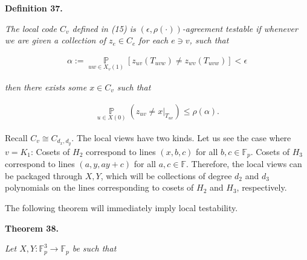 \documentclass[10pt,a4paper]{article}
\begin{document}


\par\medskip\noindent\textbf{
\textbf{Definition 37}\textbf{.}
}\par



\emph{The local code $C_{v}$ defined in (15) is $(\epsilon,\rho(\cdot))$-agreement testable if whenever we are given a collection of $z_{e}\in C_{e}$ for each $e\ni v$, such that}\par


\[\begin{gathered}
\alpha:=\operatorname*{\mathbb{P}}_{uw\in X_{v}(1)}[z_{uv}(T_{uvw})\neq z_{wv}(T_{uvw})]<\epsilon
\end{gathered}\]


\emph{then there exists some $x\in C_{v}$ such that}\par


\[\begin{gathered}
\operatorname*{\mathbb{P}}_{u\in X(0)}(z_{uv}\neq x|_{T_{uv}})\leq\rho(\alpha).
\end{gathered}\]






Recall $C_{v}\cong C_{d_{x},d_{y}}$. The local views have two kinds. Let us see the case where $v=K_{1}$: Cosets of $H_{2}$ correspond to lines $(x,b,c)$ for all $b,c\in\mathbb{F}_{p}$. Cosets of $H_{3}$ correspond to lines $(a,y,ay+c)$ for all $a,c\in\mathbb{F}$.
Therefore, the local views can be packaged through $X,Y$, which will be collections of degree $d_{2}$ and $d_{3}$ polynomials on the lines corresponding to cosets of $H_{2}$ and $H_{3}$, respectively.\par




The following theorem will immediately imply local testability.\par





\par\medskip\noindent\textbf{
\textbf{Theorem 38}\textbf{.}
}\par



\emph{Let $X,Y:\mathbb{F}_{p}^{3}\to\mathbb{F}_{p}$ be such that}\par
\end{document}
